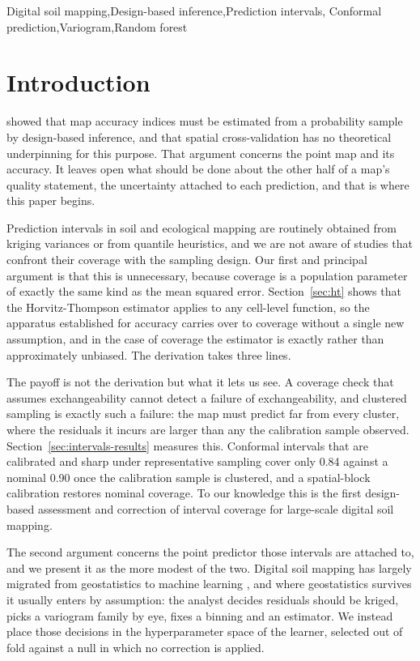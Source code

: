 \documentclass[preprint,12pt,authoryear]{elsarticle}
\begin{document}
\begin{frontmatter}
\begin{keyword}
Digital soil mapping\sep Design-based inference\sep Prediction intervals\sep
Conformal prediction\sep Variogram\sep Random forest
\end{keyword}

\end{frontmatter}

\section{Introduction}

\citet{wadoux2021} showed that map accuracy indices must be estimated from a
probability sample by design-based inference, and that spatial cross-validation
has no theoretical underpinning for this purpose. That argument concerns the
point map and its accuracy. It leaves open what should be done about the other
half of a map's quality statement, the uncertainty attached to each prediction,
and that is where this paper begins.

Prediction intervals in soil and ecological mapping are routinely obtained from
kriging variances or from quantile heuristics, and we are not aware of studies
that confront their coverage with the sampling design. Our first and principal
argument is that this is unnecessary, because coverage is a population parameter
of exactly the same kind as the mean squared error. Section~\ref{sec:ht} shows
that the Horvitz-Thompson estimator applies to any cell-level function, so the
apparatus \citet{wadoux2021} established for accuracy carries over to coverage
without a single new assumption, and in the case of coverage the estimator is
exactly rather than approximately unbiased. The derivation takes three lines.

The payoff is not the derivation but what it lets us see. A coverage check that
assumes exchangeability cannot detect a failure of exchangeability, and clustered
sampling is exactly such a failure: the map must predict far from every cluster,
where the residuals it incurs are larger than any the calibration sample
observed. Section~\ref{sec:intervals-results} measures this. Conformal intervals
that are calibrated and sharp under representative sampling cover only 0.84
against a nominal 0.90 once the calibration sample is clustered, and a
spatial-block calibration restores nominal coverage. To our knowledge this is the
first design-based assessment and correction of interval coverage for
large-scale digital soil mapping.

The second argument concerns the point predictor those intervals are attached
to, and we present it as the more modest of the two. Digital soil mapping has
largely migrated from geostatistics to machine learning \citep{mcbratney2003},
and where geostatistics survives it usually enters by assumption: the analyst
decides residuals should be kriged, picks a variogram family by eye, fixes a
binning and an estimator. We instead place those decisions in the hyperparameter
space of the learner, selected out of fold against a null in which no correction
is applied.
\end{document}
